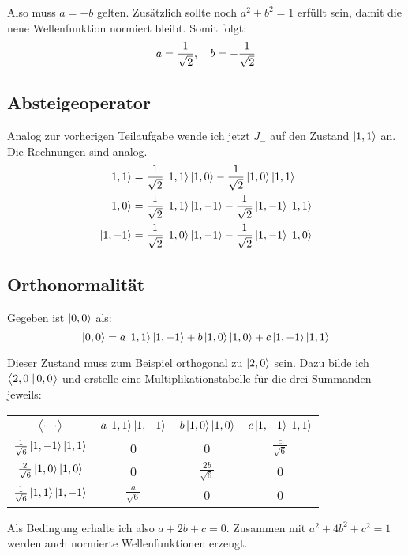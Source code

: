 Also muss $a = -b$ gelten. Zusätzlich sollte noch $a^2 + b^2 = 1$ erfüllt sein,
damit die neue Wellenfunktion normiert bleibt. Somit folgt:
\[
	a = \frac1{\sqrt 2}
	,\quad
	b = - \frac1{\sqrt 2}
\]

\subsection{Absteigeoperator}

Analog zur vorherigen Teilaufgabe wende ich jetzt $J_-$ auf den Zustand
$\left| 1, 1 \right\rangle$ an. Die Rechnungen sind analog.
\begin{align*}
	\left| 1, 1 \right\rangle &= \frac1{\sqrt 2} \left| 1, 1 \right\rangle \left| 1, 0 \right\rangle - \frac1{\sqrt 2} \left| 1, 0 \right\rangle \left| 1, 1 \right\rangle \\
	\left| 1, 0 \right\rangle &= \frac1{\sqrt 2} \left| 1, 1 \right\rangle \left| 1, -1 \right\rangle - \frac1{\sqrt 2} \left| 1, -1 \right\rangle \left| 1, 1 \right\rangle \\
	\left| 1, -1 \right\rangle &= \frac1{\sqrt 2} \left| 1, 0 \right\rangle \left| 1, -1 \right\rangle - \frac1{\sqrt 2} \left| 1, -1 \right\rangle \left| 1, 0 \right\rangle
\end{align*}

\subsection{Orthonormalität}

Gegeben ist $\left| 0, 0 \right\rangle$ als:
\[
	\left| 0, 0 \right\rangle = a \left| 1, 1 \right\rangle \left| 1, -1 \right\rangle + b \left| 1, 0 \right\rangle \left| 1, 0 \right\rangle + c \left| 1, -1 \right\rangle \left| 1, 1 \right\rangle
\]

Dieser Zustand muss zum Beispiel orthogonal zu $\left| 2, 0 \right\rangle$ sein. Dazu bilde
ich $\braket{2, 0}{0, 0}$ und erstelle eine Multiplikationstabelle für die drei
Summanden jeweils:
\begin{center}
	\begin{tabular}{c|ccc}
		$\braket\cdot\cdot$ & $a \left| 1, 1 \right\rangle \left| 1, -1 \right\rangle$ & $b \left| 1, 0 \right\rangle \left| 1, 0 \right\rangle$ & $c \left| 1, -1 \right\rangle \left| 1, 1 \right\rangle$ \\
		\hline
		$\frac{1}{\sqrt6} \left| 1, -1 \right\rangle \left| 1, 1 \right\rangle$ & 0 & 0 & $\frac c{\sqrt6}$ \\
		$\frac{2}{\sqrt6} \left| 1, 0 \right\rangle \left| 1, 0 \right\rangle$ & 0 & $\frac{2b}{\sqrt6}$ & 0  \\
		$\frac{1}{\sqrt6} \left| 1, 1 \right\rangle \left| 1, -1 \right\rangle$ & $\frac{a}{\sqrt6}$ & 0 & 0  \\
	\end{tabular}
\end{center}

Als Bedingung erhalte ich also $a + 2b + c = 0$. Zusammen mit $a^2 + 4b^2 + c^2
= 1$ werden auch normierte Wellenfunktionen erzeugt.


\IfFileExists{\bibliographyfile}{
}{}



